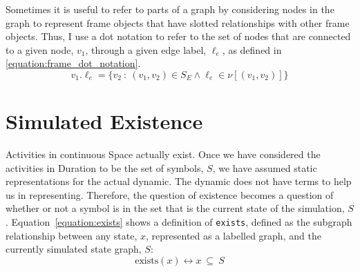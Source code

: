 Sometimes it is useful to refer to parts of a graph by considering
nodes in the graph to represent frame objects that have slotted
relationships with other frame objects.  Thus, I use a dot notation to
refer to the set of nodes that are connected to a given node, $v_1$,
through a given edge label, $\ell_e$, as defined in
{\mbox{\autoref{equation:frame_dot_notation}}}.
\begin{equation}
\label{equation:frame_dot_notation}
v_1.\ell_e = \{v_2 ~:~ (v_1, v_2) \in S_E \wedge \ell_e \in \nu[(v_1, v_2)]\}
\end{equation}

\section{Simulated Existence}

Activities in continuous Space actually exist.  Once we have
considered the activities in Duration to be the set of symbols, $S$,
we have assumed static representations for the actual dynamic.  The
dynamic does not have terms to help us in representing.  Therefore,
the question of existence becomes a question of whether or not a
symbol is in the set that is the current state of the simulation, $S$.
Equation~\ref{equation:exists} shows a definition of {\tt exists},
defined as the subgraph relationship between any state, $x$,
represented as a labelled graph, and the currently simulated state
graph, $S$:
\begin{equation}
\label{equation:exists}
\text{exists}(x) \longleftrightarrow x ~{\subseteq}~ S
\end{equation}





